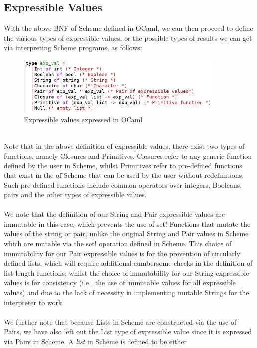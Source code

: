 \subsection{Expressible Values}
With the above BNF of Scheme defined in OCaml, we can then proceed to define the various types of expressible values, or the possible types of results we can get via interpreting Scheme programs, as follows:
\begin{figure}[!h]
  \centering
    \includegraphics[width=0.9\textwidth]{figures_progress_report/expressible_values.png}
  \caption{Expressible values expressed in OCaml}
  \label{fig:expressible_values}
\end{figure}
\\
Note that in the above definition of expressible values, there exist two types of functions, namely Closures and Primitives. Closures refer to any generic function defined by the user in Scheme, whilst Primitives refer to 
pre-defined functions that exist in the  of Scheme that can be used by the user without redefinitions. Such pre-defined functions include common operators over integers, Booleans, pairs and the other types of 
expressible values.
\\
\\
We note that the definition of our String and Pair expressible values are immutable in this case, which prevents the use of set! Functions that mutate the values of the string or pair, unlike the original String and Pair values in 
Scheme which are mutable via the set! operation defined in Scheme. This choice of immutability for our Pair expressible values is for the prevention of circularly defined lists, which will require additional cumbersome checks in 
the definition of list-length functions; whilst the choice of immutability for our String expressible values is for consistency (i.e., the use of immutable values for all expressible values) and due to the lack of necessity in 
implementing mutable Strings for the interpreter to work.
\\
\\
We further note that because Lists in Scheme are constructed via the use of Pairs, we have also left out the List type of expressible value since it is expressed via Pairs in Scheme. A \textit{list} in Scheme is defined to be either 

